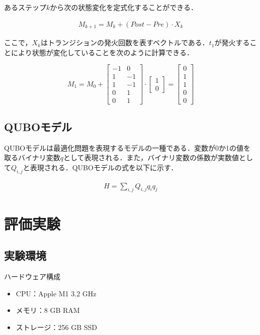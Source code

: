\documentclass[conference]{IEEEtran}
\begin{document}
あるステップ$k$から次の状態変化を定式化することができる．

\begin{align}
M_{k+1} = M_k + (Post - Pre) \cdot X_k
\end{align}

ここで，$X_k$はトランジションの発火回数を表すベクトルである．$t_1$が発火することにより状態が変化していることを次のように計算できる．

$$
M_1 = M_0 + 
\begin{bmatrix}
  -1 & 0 \\
  1 & -1 \\
  1 & -1 \\
  0 & 1 \\
  0 & 1
\end{bmatrix}
\cdot 
\begin{bmatrix}
  1 \\
  0
\end{bmatrix}
= 
\begin{bmatrix}
  0 \\
  1 \\
  1 \\
  0 \\
  0
\end{bmatrix}
$$

\subsection{QUBOモデル}
QUBOモデルは最適化問題を表現するモデルの一種である．変数が0か1の値を取るバイナリ変数$q$として表現される．また，バイナリ変数の係数が実数値として$Q_{i,j}$と表現される．QUBOモデルの式を以下に示す．

\begin{align}
H = \sum_{i,j} Q_{i,j} q_i q_j
\end{align}

\section{評価実験}
\subsection{実験環境}
ハードウェア構成
\begin{itemize}
\item CPU：Apple M1 3.2 GHz
\item メモリ：8 GB RAM
\item ストレージ：256 GB SSD
\end{itemize}  
\end{document}
